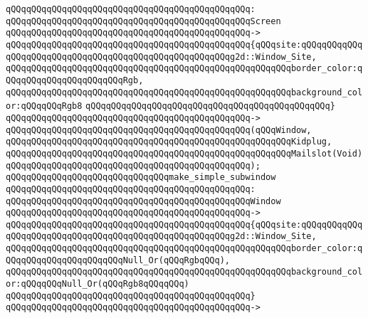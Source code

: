 \verb|qQQqqQQqqQQqqQQqqQQqqQQqqQQqqQQqqQQqqQQqqQQqqQQq:|\newline
\verb|qQQqqQQqqQQqqQQqqQQqqQQqqQQqqQQqqQQqqQQqqQQqqQQqScreen|\newline
\verb|qQQqqQQqqQQqqQQqqQQqqQQqqQQqqQQqqQQqqQQqqQQqqQQq->|\newline
\verb|qQQqqQQqqQQqqQQqqQQqqQQqqQQqqQQqqQQqqQQqqQQqqQQq{qQQqsite:qQQqqQQqqQQqqQQqqQQqqQQqqQQqqQQqqQQqqQQqqQQqqQQqqQQqqQQqg2d::Window_Site,|\newline
\verb|qQQqqQQqqQQqqQQqqQQqqQQqqQQqqQQqqQQqqQQqqQQqqQQqqQQqqQQqborder_color:qQQqqQQqqQQqqQQqqQQqqQQqRgb,|\newline
\verb|qQQqqQQqqQQqqQQqqQQqqQQqqQQqqQQqqQQqqQQqqQQqqQQqqQQqqQQqbackground_color:qQQqqQQqRgb8|\newline
\verb|qQQqqQQqqQQqqQQqqQQqqQQqqQQqqQQqqQQqqQQqqQQqqQQq}|\newline
\verb|qQQqqQQqqQQqqQQqqQQqqQQqqQQqqQQqqQQqqQQqqQQqqQQq->|\newline
\verb|qQQqqQQqqQQqqQQqqQQqqQQqqQQqqQQqqQQqqQQqqQQqqQQq(qQQqWindow,|\newline
\verb|qQQqqQQqqQQqqQQqqQQqqQQqqQQqqQQqqQQqqQQqqQQqqQQqqQQqqQQqKidplug,|\newline
\verb|qQQqqQQqqQQqqQQqqQQqqQQqqQQqqQQqqQQqqQQqqQQqqQQqqQQqqQQqMailslot(Void)|\newline
\verb|qQQqqQQqqQQqqQQqqQQqqQQqqQQqqQQqqQQqqQQqqQQqqQQq);|\newline
\newline
\verb|qQQqqQQqqQQqqQQqqQQqqQQqqQQqqQQqmake_simple_subwindow|\newline
\verb|qQQqqQQqqQQqqQQqqQQqqQQqqQQqqQQqqQQqqQQqqQQqqQQq:|\newline
\verb|qQQqqQQqqQQqqQQqqQQqqQQqqQQqqQQqqQQqqQQqqQQqqQQqWindow|\newline
\verb|qQQqqQQqqQQqqQQqqQQqqQQqqQQqqQQqqQQqqQQqqQQqqQQq->|\newline
\verb|qQQqqQQqqQQqqQQqqQQqqQQqqQQqqQQqqQQqqQQqqQQqqQQq{qQQqsite:qQQqqQQqqQQqqQQqqQQqqQQqqQQqqQQqqQQqqQQqqQQqqQQqqQQqqQQqg2d::Window_Site,|\newline
\verb|qQQqqQQqqQQqqQQqqQQqqQQqqQQqqQQqqQQqqQQqqQQqqQQqqQQqqQQqborder_color:qQQqqQQqqQQqqQQqqQQqqQQqNull_Or(qQQqRgbqQQq),|\newline
\verb|qQQqqQQqqQQqqQQqqQQqqQQqqQQqqQQqqQQqqQQqqQQqqQQqqQQqqQQqbackground_color:qQQqqQQqNull_Or(qQQqRgb8qQQqqQQq)|\newline
\verb|qQQqqQQqqQQqqQQqqQQqqQQqqQQqqQQqqQQqqQQqqQQqqQQq}|\newline
\verb|qQQqqQQqqQQqqQQqqQQqqQQqqQQqqQQqqQQqqQQqqQQqqQQq->|\newline
